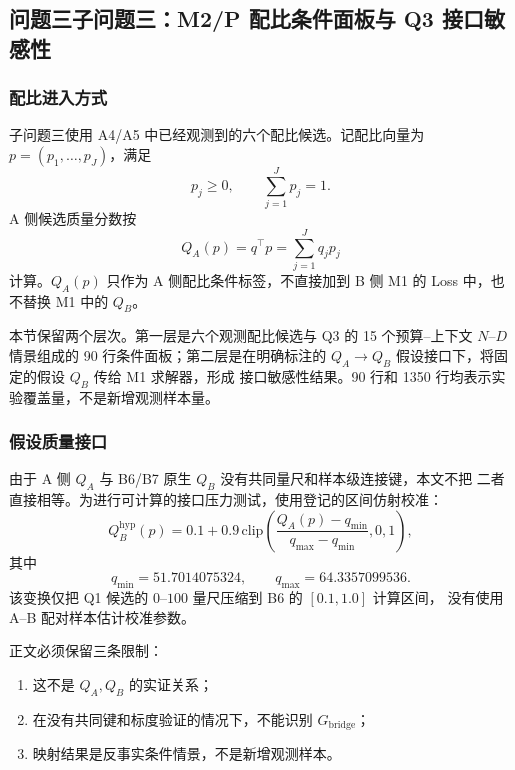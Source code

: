 
\subsection{问题三子问题三：M2/P 配比条件面板与 Q3 接口敏感性}
\label{sec:q3-subproblem3}

\subsubsection{配比进入方式}

子问题三使用 A4/A5 中已经观测到的六个配比候选。记配比向量为
$p=(p_1,\ldots,p_J)$，满足
\begin{equation}
  p_j\geq0,\qquad \sum_{j=1}^{J}p_j=1.
\end{equation}
A 侧候选质量分数按
\begin{equation}
  Q_A(p)=q^\top p=\sum_{j=1}^{J}q_jp_j
  \label{eq:q3-sp3-qa}
\end{equation}
计算。$Q_A(p)$ 只作为 A 侧配比条件标签，不直接加到 B 侧 M1 的
Loss 中，也不替换 M1 中的 $Q_B$。

本节保留两个层次。第一层是六个观测配比候选与 Q3 的 15 个预算--上下文
$N$--$D$ 情景组成的 90 行条件面板；第二层是在明确标注的
$Q_A\to Q_B$ 假设接口下，将固定的假设 $Q_B$ 传给 M1 求解器，形成
接口敏感性结果。90 行和 1350 行均表示实验覆盖量，不是新增观测样本量。

\subsubsection{假设质量接口}

由于 A 侧 $Q_A$ 与 B6/B7 原生 $Q_B$ 没有共同量尺和样本级连接键，本文不把
二者直接相等。为进行可计算的接口压力测试，使用登记的区间仿射校准：
\begin{equation}
  Q_B^{\mathrm{hyp}}(p)
  =0.1+0.9\,\mathrm{clip}
  \left(
  \frac{Q_A(p)-q_{\min}}{q_{\max}-q_{\min}},0,1
  \right),
  \label{eq:q3-sp3-hyp-map}
\end{equation}
其中
\begin{equation}
  q_{\min}=51.7014075324,\qquad
  q_{\max}=64.3357099536.
  \label{eq:q3-sp3-map-range}
\end{equation}
该变换仅把 Q1 候选的 $0$--$100$ 量尺压缩到 B6 的 $[0.1,1.0]$ 计算区间，
没有使用 A--B 配对样本估计校准参数。

正文必须保留三条限制：
\begin{enumerate}
  \item 这不是 $Q_A,Q_B$ 的实证关系；
  \item 在没有共同键和标度验证的情况下，不能识别 $G_{\mathrm{bridge}}$；
  \item 映射结果是反事实条件情景，不是新增观测样本。
\end{enumerate}

